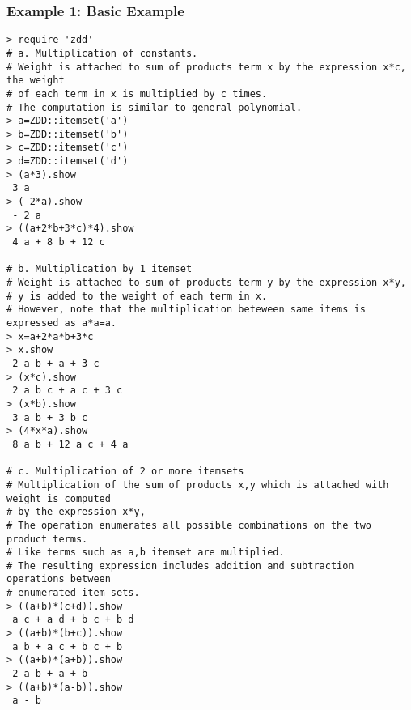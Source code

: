 \subsubsection*{Example 1: Basic Example}



\begin{Verbatim}[baselinestretch=0.7,frame=single]
> require 'zdd'
# a. Multiplication of constants.
# Weight is attached to sum of products term x by the expression x*c, the weight
# of each term in x is multiplied by c times.
# The computation is similar to general polynomial.
> a=ZDD::itemset('a')
> b=ZDD::itemset('b')
> c=ZDD::itemset('c')
> d=ZDD::itemset('d')
> (a*3).show
 3 a
> (-2*a).show
 - 2 a
> ((a+2*b+3*c)*4).show
 4 a + 8 b + 12 c

# b. Multiplication by 1 itemset
# Weight is attached to sum of products term y by the expression x*y,
# y is added to the weight of each term in x.
# However, note that the multiplication beteween same items is expressed as a*a=a.
> x=a+2*a*b+3*c
> x.show
 2 a b + a + 3 c
> (x*c).show
 2 a b c + a c + 3 c
> (x*b).show
 3 a b + 3 b c
> (4*x*a).show
 8 a b + 12 a c + 4 a

# c. Multiplication of 2 or more itemsets
# Multiplication of the sum of products x,y which is attached with weight is computed
# by the expression x*y,
# The operation enumerates all possible combinations on the two product terms.
# Like terms such as a,b itemset are multiplied.
# The resulting expression includes addition and subtraction operations between
# enumerated item sets.
> ((a+b)*(c+d)).show
 a c + a d + b c + b d
> ((a+b)*(b+c)).show
 a b + a c + b c + b
> ((a+b)*(a+b)).show
 2 a b + a + b
> ((a+b)*(a-b)).show
 a - b
\end{Verbatim}
